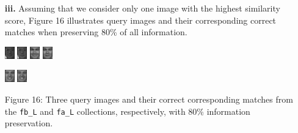 \documentclass[ 12pt ]{article}
\begin{document}
\begin{enumerate}
\begin{enumerate}
            \item[\textbf{iii.}] Assuming that we consider only one image with the highest similarity score, Figure 16 illustrates query images and their corresponding correct matches
                when preserving 80\% of all information.
                \begin{center}
                    \includegraphics[scale=5]{f_l_images/AnyConv.com__00182_940422_fb_a}
                    \includegraphics[scale=5]{f_l_images/AnyConv.com__00182_940422_fa_a}
                    \includegraphics[scale=5]{f_l_images/AnyConv.com__00753_941201_fb}
                    \includegraphics[scale=5]{f_l_images/AnyConv.com__00753_941201_fa}
                \end{center}
                \begin{center}
                    \includegraphics[scale=5]{f_l_images/AnyConv.com__00501_940519_fb}
                    \includegraphics[scale=5]{f_l_images/AnyConv.com__00501_940519_fa}
                \end{center}
                \begin{center}
                    \scriptsize
                    Figure 16: Three query images and their correct corresponding matches from the \verb|fb_L| and \verb|fa_L| collections, respectively, with 80\%
                    information preservation.
                \end{center}


\end{enumerate}
\end{enumerate}
\end{document}
